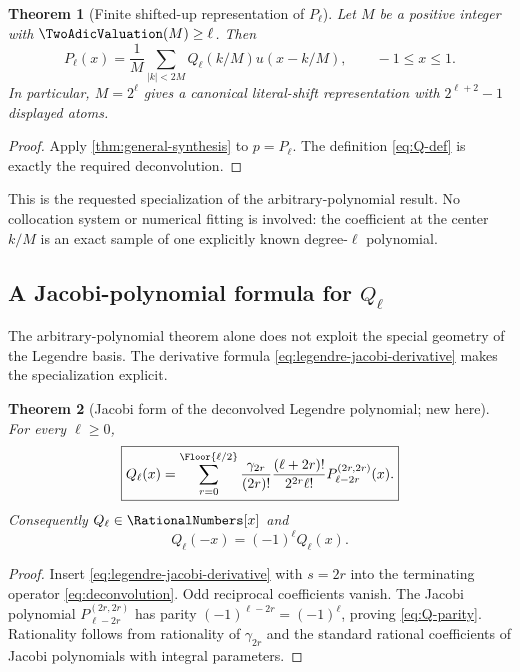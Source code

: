 \documentclass[11pt,oneside]{article}
\numberwithin{equation}{section}
\newtheorem{theorem}{Theorem}[section]
\theoremstyle{definition}
\theoremstyle{remark}
\begin{document}
\begin{theorem}[Finite shifted-up representation of $P_\ell$]
\label{thm:legendre-synthesis}
Let $M$ be a positive integer with $\TwoAdicValuation(M)\ge\ell$.  Then
\begin{equation}
 \boxed{
 P_\ell(x)=\frac1M\sum_{|k|<2M}
 Q_\ell(k/M)u(x-k/M),
 \qquad -1\le x\le1.}
 \label{eq:legendre-synthesis}
\end{equation}
In particular, $M=2^\ell$ gives a canonical literal-shift representation with
$2^{\ell+2}-1$ displayed atoms.
\end{theorem}

\begin{proof}
Apply \cref{thm:general-synthesis} to $p=P_\ell$.  The definition
\eqref{eq:Q-def} is exactly the required deconvolution.
\end{proof}

This is the requested specialization of the arbitrary-polynomial result.  No
collocation system or numerical fitting is involved: the coefficient at the
center $k/M$ is an exact sample of one explicitly known degree-$\ell$
polynomial.

\subsection{A Jacobi-polynomial formula for $Q_\ell$}

The arbitrary-polynomial theorem alone does not exploit the special geometry
of the Legendre basis.  The derivative formula \eqref{eq:legendre-jacobi-derivative}
makes the specialization explicit.

\begin{theorem}[Jacobi form of the deconvolved Legendre polynomial; new here]
\label{thm:Q-jacobi}
For every $\ell\ge0$,
\begin{equation}
 \boxed{
 Q_\ell(x)=
 \sum_{r=0}^{\Floor{\ell/2}}
 \frac{\gamma_{2r}}{(2r)!}
 \frac{(\ell+2r)!}{2^{2r}\ell!}
 P_{\ell-2r}^{(2r,2r)}(x).}
 \label{eq:Q-jacobi}
\end{equation}
Consequently $Q_\ell\in\RationalNumbers[x]$ and
\begin{equation}
 Q_\ell(-x)=(-1)^\ell Q_\ell(x).
 \label{eq:Q-parity}
\end{equation}
\end{theorem}

\begin{proof}
Insert \eqref{eq:legendre-jacobi-derivative} with $s=2r$ into the terminating
operator \eqref{eq:deconvolution}.  Odd reciprocal coefficients vanish.  The
Jacobi polynomial $P_{\ell-2r}^{(2r,2r)}$ has parity
$(-1)^{\ell-2r}=(-1)^\ell$, proving \eqref{eq:Q-parity}.  Rationality follows
from rationality of $\gamma_{2r}$ and the standard rational coefficients of
Jacobi polynomials with integral parameters.
\end{proof}
\end{document}
